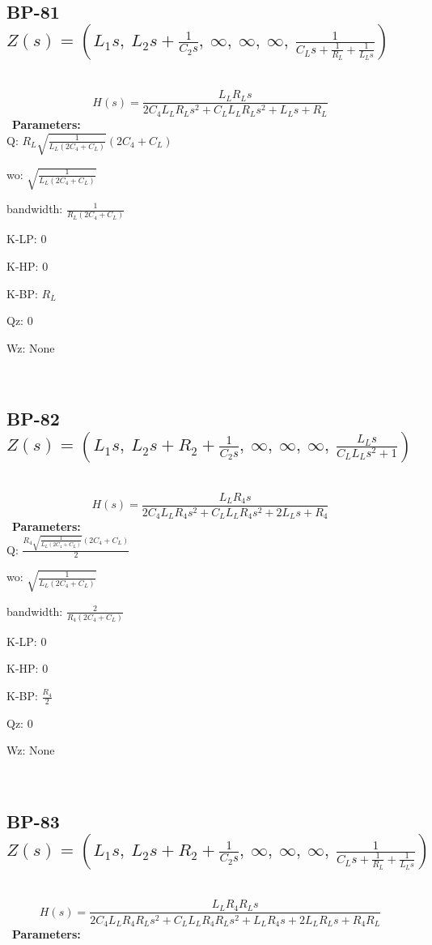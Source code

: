 \documentclass{article}
\begin{document}
\ 

\subsection{BP-81 $Z(s) = \left( L_{1} s, \  L_{2} s + \frac{1}{C_{2} s}, \  \infty, \  \infty, \  \infty, \  \frac{1}{C_{L} s + \frac{1}{R_{L}} + \frac{1}{L_{L} s}}\right)$ } \ 
\textbf{\[H(s) = \frac{L_{L} R_{L} s}{2 C_{4} L_{L} R_{L} s^{2} + C_{L} L_{L} R_{L} s^{2} + L_{L} s + R_{L}}\] } \ 
\textbf{Parameters:}\\ 

Q: $R_{L} \sqrt{\frac{1}{L_{L} \left(2 C_{4} + C_{L}\right)}} \left(2 C_{4} + C_{L}\right)$\ 

wo: $\sqrt{\frac{1}{L_{L} \left(2 C_{4} + C_{L}\right)}}$\ 

bandwidth: $\frac{1}{R_{L} \left(2 C_{4} + C_{L}\right)}$\ 

K-LP: $0$\ 

K-HP: $0$\ 

K-BP: $R_{L}$\ 

Qz: $0$\ 

Wz: $\text{None}$\ 

\ 

\subsection{BP-82 $Z(s) = \left( L_{1} s, \  L_{2} s + R_{2} + \frac{1}{C_{2} s}, \  \infty, \  \infty, \  \infty, \  \frac{L_{L} s}{C_{L} L_{L} s^{2} + 1}\right)$ } \ 
\textbf{\[H(s) = \frac{L_{L} R_{4} s}{2 C_{4} L_{L} R_{4} s^{2} + C_{L} L_{L} R_{4} s^{2} + 2 L_{L} s + R_{4}}\] } \ 
\textbf{Parameters:}\\ 

Q: $\frac{R_{4} \sqrt{\frac{1}{L_{L} \left(2 C_{4} + C_{L}\right)}} \left(2 C_{4} + C_{L}\right)}{2}$\ 

wo: $\sqrt{\frac{1}{L_{L} \left(2 C_{4} + C_{L}\right)}}$\ 

bandwidth: $\frac{2}{R_{4} \left(2 C_{4} + C_{L}\right)}$\ 

K-LP: $0$\ 

K-HP: $0$\ 

K-BP: $\frac{R_{4}}{2}$\ 

Qz: $0$\ 

Wz: $\text{None}$\ 

\ 

\subsection{BP-83 $Z(s) = \left( L_{1} s, \  L_{2} s + R_{2} + \frac{1}{C_{2} s}, \  \infty, \  \infty, \  \infty, \  \frac{1}{C_{L} s + \frac{1}{R_{L}} + \frac{1}{L_{L} s}}\right)$ } \ 
\textbf{\[H(s) = \frac{L_{L} R_{4} R_{L} s}{2 C_{4} L_{L} R_{4} R_{L} s^{2} + C_{L} L_{L} R_{4} R_{L} s^{2} + L_{L} R_{4} s + 2 L_{L} R_{L} s + R_{4} R_{L}}\] } \ 
\textbf{Parameters:}\\ 
\end{document}
